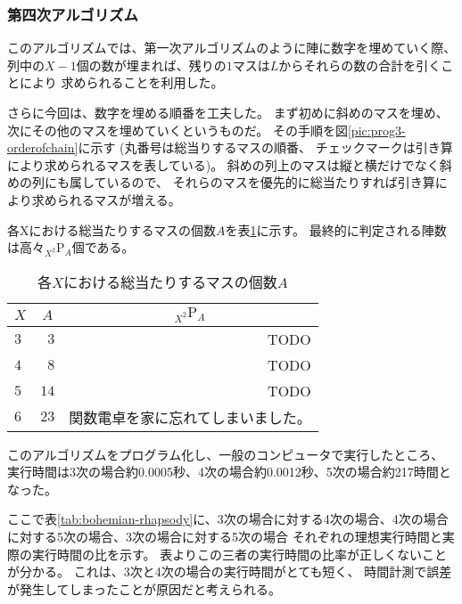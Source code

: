 \subsubsection{第四次アルゴリズム}
このアルゴリズムでは、第一次アルゴリズムのように陣に数字を埋めていく際、
列中の$X-1$個の数が埋まれば、残りの$1$マスは$L$からそれらの数の合計を引くことにより
求められることを利用した。

さらに今回は、数字を埋める順番を工夫した。
まず初めに斜めのマスを埋め、次にその他のマスを埋めていくというものだ。
その手順を図\ref{pic:prog3-orderofchain}に示す
(丸番号は総当りするマスの順番、
チェックマークは引き算により求められるマスを表している)。
斜めの列上のマスは縦と横だけでなく斜めの列にも属しているので、
それらのマスを優先的に総当たりすれば引き算により求められるマスが増える。

各Xにおける総当たりするマスの個数$A$を表\ref{tab:chaincount-each-X}に示す。
最終的に判定される陣数は高々$_{X^2} \mathrm{P} _A$個である。

\begin{table}[htb]
	\begin{center}
	\begin{tabular}{|l|r|r|}
\hline \hline
\multicolumn{1}{|c|}{$X$} & \multicolumn{1}{|c|}{$A$} & \multicolumn{1}{|c|}{$_{X^2} \mathrm{P} _A$} \\
\hline \hline
$3$ & $3$ & TODO \\
$4$ & $8$ & TODO \\
$5$ & $14$ & TODO \\
$6$ & $23$ & 関数電卓を家に忘れてしまいました。 \\
\hline
	\end{tabular}
	\end{center}
	\caption{各$X$における総当たりするマスの個数$A$}
	\label{tab:chaincount-each-X}
\end{table}

このアルゴリズムをプログラム化し、一般のコンピュータで実行したところ、
実行時間は3次の場合約0.0005秒、4次の場合約0.0012秒、5次の場合約217時間となった。

ここで表\ref{tab:bohemian-rhapsody}に、3次の場合に対する4次の場合、4次の場合に対する5次の場合、3次の場合に対する5次の場合
それぞれの理想実行時間と実際の実行時間の比を示す。
表よりこの三者の実行時間の比率が正しくないことが分かる。
これは、3次と4次の場合の実行時間がとても短く、
時間計測で誤差が発生してしまったことが原因だと考えられる。

